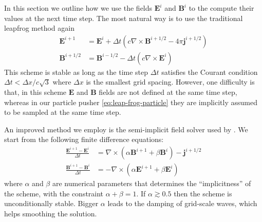In this section we outline how we use the fields $\mathbf{E}^{i}$ and
$\mathbf{B}^{i}$ to the compute their values at the next time step. The most
natural way is to use the traditional leapfrog method again
\begin{align}
  \label{eq:maxwell-leapfrog}
  \mathbf{E}^{i+1} &= \mathbf{E}^i + \Delta t (c\nabla\times \mathbf{B}^{i+1/2} - 4\pi \mathbf{j}^{i+1/2}) \\
  \mathbf{B}^{i+1/2} &= \mathbf{B}^{i-1/2} - \Delta t (c\nabla\times \mathbf{E}^i)
\end{align}
This scheme is stable as long as the time step $\Delta t$ satisfies the Courant
condition $\Delta t < \Delta x / c\sqrt{3}$ where $\Delta x$ is the smallest
grid spacing. However, one difficulty is that, in this scheme $\mathbf{E}$ and
$\mathbf{B}$ fields are not defined at the same time step, whereas in our
particle pusher \eqref{eq:leap-frog-particle} they are implicitly assumed to be
sampled at the same time step.

An improved method we employ is the semi-implicit field solver used by
\citep{haugboelle_photon-plasma:_2012}. We start from the following finite
difference equations:
\begin{align}
  \frac{\mathbf{E}^{i+1} -\mathbf{E}^{i}}{\Delta t} & = \nabla \times (
  \alpha \mathbf{B}^{i+1} + \beta \mathbf{B}^{i} ) -\mathbf{j}^{i+1/2}\\
  \frac{\mathbf{B}^{i+1} -\mathbf{B}^{i}}{\Delta t} & = - \nabla \times
  ( \alpha \mathbf{E}^{i+1} + \beta \mathbf{E}^{i} )
\end{align}
where $\alpha$ and $\beta$ are numerical parameters that determines
the ``implicitness'' of the scheme, with the constraint $\alpha +
\beta = 1$. If $\alpha \gtrsim 0.5$ then the scheme is unconditionally
stable. Bigger $\alpha$ leads to the damping of grid-scale waves,
which helps smoothing the solution.

